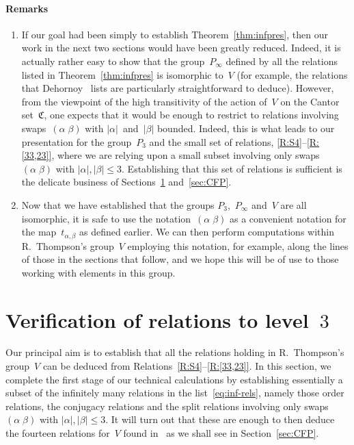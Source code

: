 \documentclass[a4paper,11pt]{article}
\numberwithin{equation}{section}
\newcommand{\C}{\mathfrak{C}}
\newcommand{\length}[1]{\mathopen{|}#1\mathclose{|}}
\newcommand{\swap}[2]{(#1\;#2)}
\renewcommand{\leq}{\leqslant}
\begin{document}
\paragraph{Remarks}
\begin{enumerate}
\item If our goal had been simply to establish
  Theorem~\ref{thm:infpres}, then our work in the next two sections
  would have been greatly reduced.  Indeed, it is actually rather easy
  to show that the group~$P_{\infty}$ defined by all the relations
  listed in Theorem~\ref{thm:infpres} is isomorphic to~$V$ (for
  example, the relations that Dehornoy~\cite{Dehornoy} lists are
  particularly straightforward to deduce).  However, from the
  viewpoint of the high transitivity of the action of~$V$ on the
  Cantor set~$\C$, one expects that it would be enough to restrict to
  relations involving swaps~$\swap{\alpha}{\beta}$ with
  $\length{\alpha}$~and~$\length{\beta}$ bounded.  Indeed, this is
  what leads to our presentation for the group~$P_{3}$ and the small
  set of relations, \ref{R:S4}--\ref{R:[33,23]}, where we are relying
  upon a small subset involving only swaps~$\swap{\alpha}{\beta}$ with
  $\length{\alpha},\length{\beta} \leq 3$.  Establishing
  that this set of relations is sufficient is the delicate business of
  Sections~\ref{sec:level3} and~\ref{sec:CFP}.

\item Now that we have established that the groups
  $P_{3}$,~$P_{\infty}$ and~$V$ are all isomorphic, it is safe to use
  the notation~$\swap{\alpha}{\beta}$ as a convenient notation for the
  map~$t_{\alpha,\beta}$ as defined earlier.  We can then perform
  computations within R.~Thompson's group~$V$ employing this notation,
  for example, along the lines of those in the sections that follow,
  and we hope this will be of use to those working with elements in
  this group.
\end{enumerate}


\section{\boldmath Verification of relations to level~$3$}
\label{sec:level3}

Our principal aim is to establish that all the relations holding in
R.~Thompson's group~$V$ can be deduced from
Relations~\ref{R:S4}--\ref{R:[33,23]}.  In this section, we complete
the first stage of our technical calculations by establishing
essentially a subset of the infinitely many relations in the
list~\eqref{eq:inf-rels}, namely those order relations, the conjugacy
relations and the split relations involving only
swaps~$\swap{\alpha}{\beta}$ with $\length{\alpha},\length{\beta} \leq
3$.  It will turn out that these are enough to then deduce the
fourteen relations for~$V$ found in~\cite{CFP} as we shall see in
Section~\ref{sec:CFP}.
\end{document}
